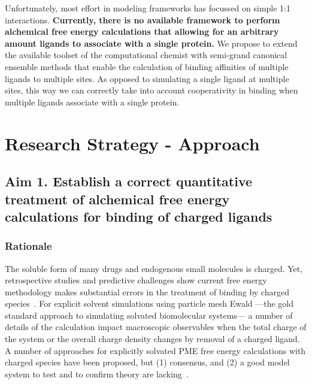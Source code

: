 \documentclass[10pt,final]{article}
\newif\ifinstr
\newcommand{\instr}[1]{\ifdraft{\ifinstr {\color{cyan}\emph{#1}} \fi}{}}
\begin{document}
Unfortunately, most effort in modeling frameworks has focussed on simple 1:1 interactions. 
%
\textbf{Currently, there is no available framework to perform alchemical free energy calculations that allowing for an arbitrary amount ligands to associate with a single protein.}
%
We propose to extend the available toolset of the computational chemist with semi-grand canonical ensemble methods that enable the calculation of binding affinities of multiple ligands to multiple sites.
%
As opposed to simulating a single ligand at multiple sites, this way we can correctly take into account cooperativity in binding when multiple ligands associate with a single protein.

\section*{Research Strategy - Approach}
\instr{Approach: More specific background information. Describe in detail the experimental design and research methods to be used. Technical hurdles to be overcome should be mentioned. Alternative approaches should be given for experiments that may not be feasible. Discussion of expected or possible results and their interpretation. Best format for each specific aim: a) rationale, b) methods, c) expected results, d) alternatives. Theory aims should follow a similar structure where possible.}


\subsection*{Aim 1. Establish a correct quantitative treatment of alchemical free energy calculations for binding of charged ligands}
\subsubsection*{Rationale}
The soluble form of many drugs and endogenous small molecules is charged. Yet, retrospective studies and predictive challenges show current free energy methodology makes substantial errors in the treatment of binding by charged species~\autocite{Rocklin2013b,Muddana2014a}.
%
For explicit solvent simulations using particle mesh Ewald ---the gold standard approach to simulating solvated biomolecular systems--- a number of details of the calculation impact macroscopic observables when the total charge of the system or the overall charge density changes by removal of a charged ligand.
%
A number of approaches for explicitly solvated PME free energy calculations with charged species have been proposed, but (1) consensus, and (2) a good model system to test and to confirm theory are lacking~\autocite{Reif2013a, Rocklin2013a, Lin2014a}.
\end{document}
